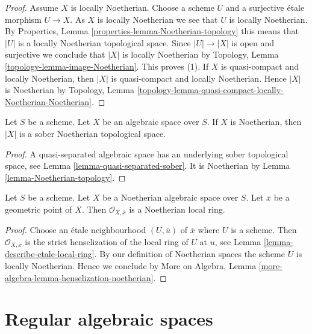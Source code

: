 \begin{proof}
Assume $X$ is locally Noetherian.
Choose a scheme $U$ and a surjective \'etale morphism
$U \to X$. As $X$ is locally Noetherian we see that $U$ is locally
Noetherian. By
Properties, Lemma \ref{properties-lemma-Noetherian-topology}
this means that $|U|$ is a locally Noetherian topological space.
Since $|U| \to |X|$ is open and surjective we conclude that
$|X|$ is locally Noetherian by
Topology, Lemma \ref{topology-lemma-image-Noetherian}.
This proves (1). If $X$ is quasi-compact and locally Noetherian,
then $|X|$ is quasi-compact and locally Noetherian. Hence $|X|$
is Noetherian by
Topology,
Lemma \ref{topology-lemma-quasi-compact-locally-Noetherian-Noetherian}.
\end{proof}

\begin{lemma}
\label{lemma-Noetherian-sober}
Let $S$ be a scheme. Let $X$ be an algebraic space over $S$.
If $X$ is Noetherian, then $|X|$ is a sober Noetherian topological space.
\end{lemma}

\begin{proof}
A quasi-separated algebraic space has an underlying sober topological
space, see
Lemma \ref{lemma-quasi-separated-sober}.
It is Noetherian by
Lemma \ref{lemma-Noetherian-topology}.
\end{proof}

\begin{lemma}
\label{lemma-Noetherian-local-ring-Noetherian}
Let $S$ be a scheme. Let $X$ be a Noetherian algebraic space over $S$.
Let $\overline{x}$ be a geometric point of $X$. Then
$\mathcal{O}_{X, \overline{x}}$ is a Noetherian local ring.
\end{lemma}

\begin{proof}
Choose an \'etale neighbourhood $(U, \overline{u})$ of $\overline{x}$
where $U$ is a scheme. Then $\mathcal{O}_{X, \overline{x}}$ is the
strict henselization of the local ring of $U$ at $u$, see
Lemma \ref{lemma-describe-etale-local-ring}.
By our definition of Noetherian spaces the scheme $U$ is locally Noetherian.
Hence we conclude by
More on Algebra, Lemma \ref{more-algebra-lemma-henselization-noetherian}.
\end{proof}








\section{Regular algebraic spaces}
\label{section-regular}

